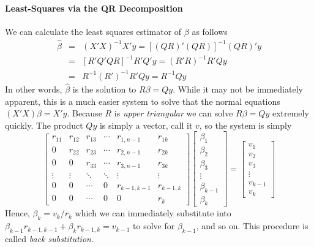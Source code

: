 \documentclass[12pt]{article}
\theoremstyle{definition}
\begin{document}
\paragraph{Least-Squares via the QR Decomposition} We can calculate the least squares estimator of $\beta$ as follows
\begin{eqnarray*}
  \widehat{\beta} &=& (X'X)^{-1} X'y = \left[(QR)' (QR) \right]^{-1} (QR)' y\\
    &=&\left[ R' Q' Q R\right]^{-1} R'Q' y = (R'R)^{-1} R'Q y\\
    &=& R^{-1} (R')^{-1} R' Qy = R^{-1} Qy
\end{eqnarray*}
In other words, $\widehat{\beta}$ is the solution to $R\beta = Qy$. While it may not be immediately apparent, this is a much easier system to solve that the normal equations $(X'X) \beta = X'y$. Because $R$ is \emph{upper triangular} we can solve $R\beta = Qy$ extremely quickly. The product $Qy$ is simply a vector, call it $v$, so the system is simply
  $$\left[
    \begin{array}
      {cccccc}
      r_{11} & r_{12}  & r_{13}& \cdots & r_{1,n-1} & r_{1k} \\
      0 & r_{22} & r_{23}&\cdots & r_{2,n-1} & r_{2k}\\
      0&  0 &  r_{33}& \cdots & r_{3,n-1} & r_{3k}\\  
      \vdots & \vdots & \ddots& \ddots & \vdots & \vdots\\
      0 & 0 & \cdots &0  & r_{k-1, k-1} & r_{k-1, k} \\
      0 & 0 & \cdots & 0 & 0 & r_{k}
    \end{array}
  \right] \left[ \begin{array}
    {ccc}
    \beta_1 \\ \beta_2 \\ \beta_3 \\ \vdots \\ \beta_{k-1} \\ \beta_k
  \end{array}\right] = \left[ \begin{array}
    {c}
    v_1  \\ v_2  \\ v_3 \\  \vdots \\ v_{k-1} \\ v_{k}
  \end{array}\right]
  $$
Hence, $\beta_k = v_k / r_k$ which we can immediately substitute into $\beta_{k-1} r_{k-1,k-1} + \beta_k r_{k-1,k} = v_{k-1}$ to solve for $\beta_{k-1}$, and so on. This procedure is called \emph{back substitution}. 
\end{document}

